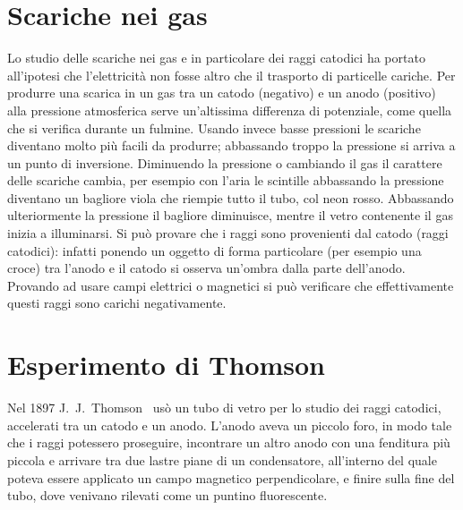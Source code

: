 \section{Scariche nei gas}
Lo studio delle scariche nei gas e in particolare dei raggi catodici ha portato all'ipotesi che l'elettricità non fosse altro che il trasporto di particelle cariche. Per produrre una scarica in un gas tra un catodo (negativo) e un anodo (positivo) alla pressione atmosferica serve un'altissima differenza di potenziale, come quella che si verifica durante un fulmine. Usando invece basse pressioni le scariche diventano molto più facili da produrre; abbassando troppo la pressione si arriva a un punto di inversione. Diminuendo la pressione o cambiando il gas il carattere delle scariche cambia, per esempio con l'aria le scintille abbassando la pressione diventano un bagliore viola che riempie tutto il tubo, col neon rosso. Abbassando ulteriormente la pressione il bagliore diminuisce, mentre il vetro contenente il gas inizia a illuminarsi. Si può provare che i raggi sono provenienti dal catodo (raggi catodici): infatti ponendo un oggetto di forma particolare (per esempio una croce) tra l'anodo e il catodo si osserva un'ombra dalla parte dell'anodo. Provando ad usare campi elettrici o magnetici si può verificare che effettivamente questi raggi sono carichi negativamente.
\section{Esperimento di Thomson}
Nel 1897 J.~J.~Thomson~\cite{thomson1897} usò un tubo di vetro per lo studio dei raggi catodici, accelerati tra un catodo e un anodo. L'anodo aveva un piccolo foro, in modo tale che i raggi potessero proseguire, incontrare un altro anodo con una fenditura più piccola e arrivare tra due lastre piane di un condensatore, all'interno del quale poteva essere applicato un campo magnetico perpendicolare, e finire sulla fine del tubo, dove venivano rilevati come un puntino fluorescente.

